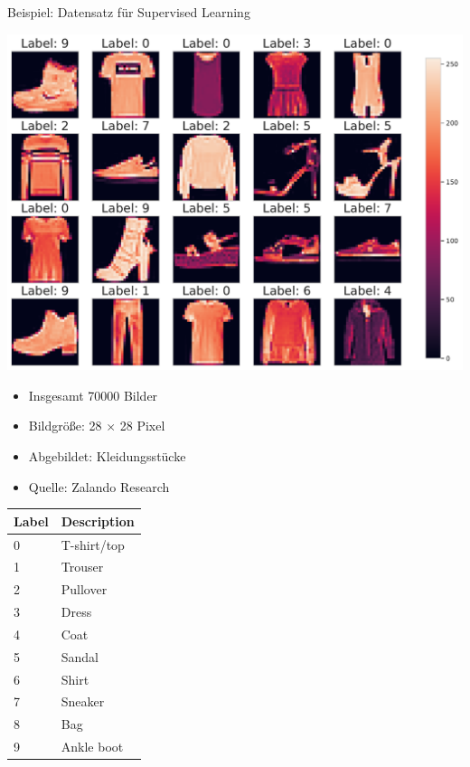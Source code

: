 \documentclass[aspectratio=169, 10pt]{beamer}
\begin{document}
\begin{frame}{Beispiel: Datensatz für Supervised Learning}
  \begin{minipage}{.6\textwidth}
    \centering \includegraphics[width=\textwidth]{fashion_mnist}
  \end{minipage}\hfill%
  \begin{minipage}{.4\textwidth}
    \begin{itemize}
    \item Insgesamt 70000 Bilder
    \item Bildgröße: 28 \(\times\) 28 Pixel
    \item Abgebildet: Kleidungsstücke 
    \item Quelle: Zalando Research \parencite{xiao2017fashion}
    \end{itemize}

    \vspace{.5cm}

    \tiny

    \centering
    \begin{tabular}{ll}
      \toprule
      \textbf{Label} & 	\textbf{Description}\\
      \midrule
      0 & 	T-shirt/top\\
      1 & 	Trouser\\
      2 & 	Pullover\\
      3 & 	Dress\\
      4 & 	Coat\\
      5 & 	Sandal\\
      6 & 	Shirt\\
      7 & 	Sneaker\\
      8 & 	Bag\\
      9 & 	Ankle boot\\
      \bottomrule
    \end{tabular}

  \end{minipage}

\end{frame}
\end{document}
